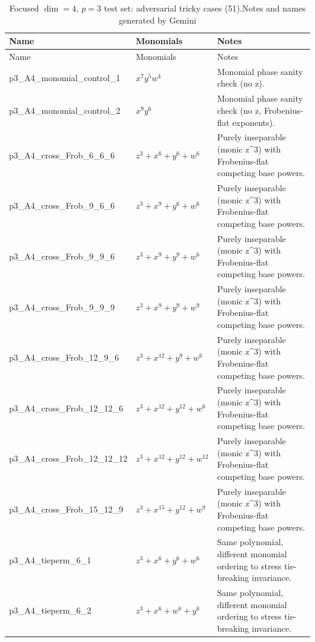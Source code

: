\documentclass[11pt]{amsart}
\begin{document}
\begin{longtable}{@{}p{} p{} p{}@{}}
\caption{Focused $\dim=4$, $p=3$ test set: adversarial tricky cases (51).Notes and names generated by Gemini}\label{tab:tricky51}\\
\toprule
Name & Monomials  & Notes \\
\midrule
\endfirsthead
\toprule
Name & Monomials  & Notes \\
\midrule
\endhead
p3\_A4\_monomial\_control\_1 & $x^{7}y^{5}w^{4}$ & Monomial phase sanity check (no z). \\
p3\_A4\_monomial\_control\_2 & $x^{9}y^{6}$ & Monomial phase sanity check (no z, Frobenius-flat exponents). \\
p3\_A4\_cross\_Frob\_6\_6\_6 & $z^{3} + x^{6} + y^{6} + w^{6}$ & Purely inseparable (monic z\textasciicircum{}3) with Frobenius-flat competing base powers. \\
p3\_A4\_cross\_Frob\_9\_6\_6 & $z^{3} + x^{9} + y^{6} + w^{6}$ & Purely inseparable (monic z\textasciicircum{}3) with Frobenius-flat competing base powers. \\
p3\_A4\_cross\_Frob\_9\_9\_6 & $z^{3} + x^{9} + y^{9} + w^{6}$ & Purely inseparable (monic z\textasciicircum{}3) with Frobenius-flat competing base powers. \\
p3\_A4\_cross\_Frob\_9\_9\_9 & $z^{3} + x^{9} + y^{9} + w^{9}$ & Purely inseparable (monic z\textasciicircum{}3) with Frobenius-flat competing base powers. \\
p3\_A4\_cross\_Frob\_12\_9\_6 & $z^{3} + x^{12} + y^{9} + w^{6}$ & Purely inseparable (monic z\textasciicircum{}3) with Frobenius-flat competing base powers. \\
p3\_A4\_cross\_Frob\_12\_12\_6 & $z^{3} + x^{12} + y^{12} + w^{6}$ & Purely inseparable (monic z\textasciicircum{}3) with Frobenius-flat competing base powers. \\
p3\_A4\_cross\_Frob\_12\_12\_12 & $z^{3} + x^{12} + y^{12} + w^{12}$ & Purely inseparable (monic z\textasciicircum{}3) with Frobenius-flat competing base powers. \\
p3\_A4\_cross\_Frob\_15\_12\_9 & $z^{3} + x^{15} + y^{12} + w^{9}$ & Purely inseparable (monic z\textasciicircum{}3) with Frobenius-flat competing base powers. \\
p3\_A4\_tieperm\_6\_1 & $z^{3} + x^{6} + y^{6} + w^{6}$ & Same polynomial, different monomial ordering to stress tie-breaking invariance. \\
p3\_A4\_tieperm\_6\_2 & $z^{3} + x^{6} + w^{6} + y^{6}$ & Same polynomial, different monomial ordering to stress tie-breaking invariance. \\

\end{longtable}
\end{document}
